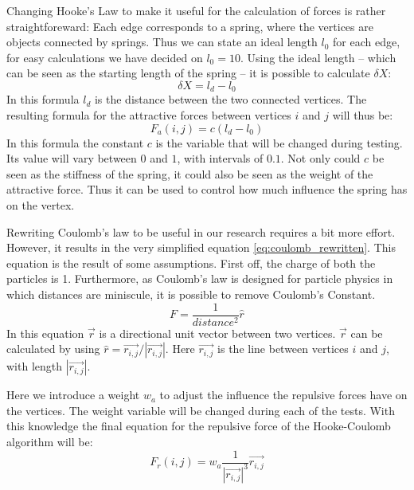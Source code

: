 \documentclass[a4paper,12pt]{article}
\begin{document}
    Changing Hooke's Law to make it useful for the calculation of forces is rather straightforeward:
    Each edge corresponds to a spring, where the vertices are objects connected by springs.
    Thus we can state an ideal length $l_0$ for each edge, for easy calculations we have decided on $l_0 = 10$.
    Using the ideal length -- which can be seen as the starting length of the spring -- it is possible to calculate $\delta X$:
    \begin{equation}
      \delta X =  l_d - l_0
    \end{equation}
    In this formula $l_d$ is the distance between the two connected vertices.
    The resulting formula for the attractive forces between vertices $i$ and $j$ will thus be:
    \begin{equation}
      F_a (i,j) = c (l_d - l_0)
    \end{equation}
    In this formula the constant $c$ is the variable that will be changed during testing.
    Its value will vary between $ 0 $ and $1$, with intervals of $0.1$.
    Not only could $c$ be seen as the stiffness of the spring, it could also be seen as the weight of the attractive force.
    Thus it can be used to control how much influence the spring has on the vertex.

    Rewriting Coulomb's law to be useful in our research requires a bit more effort.
    However, it results in the very simplified equation \ref{eq:coulomb_rewritten}.
    This equation is the result of some assumptions.
    First off, the charge of both the particles is 1.
    Furthermore, as Coulomb's law is designed for particle physics in which distances are miniscule, it is possible to remove Coulomb's Constant.
    \begin{equation}
      F = \frac{1}{distance^2} \hat{r}
    \end{equation}
    In this equation $\vec{r}$ is a directional unit vector between two vertices.
    $\vec{r}$ can be calculated by using $\hat{r} = \vec{r_{i,j}} / |\vec{r_{i,j}}|$.
    Here $\vec{r_{i,j}}$ is the line between vertices $i$ and $j$, with length $|\vec{r_{i,j}}|$.

    Here we introduce a weight $w_a $ to adjust the influence the repulsive forces have on the vertices.
    The weight variable will be changed during each of the tests.
    With this knowledge the final equation for the repulsive force of the Hooke-Coulomb algorithm will be:
    \begin{equation}
      F_r(i,j) = w_a \frac{1}{|\vec{r_{i,j}}|^3} \vec{r_{i,j}}
    \end{equation}
\end{document}
